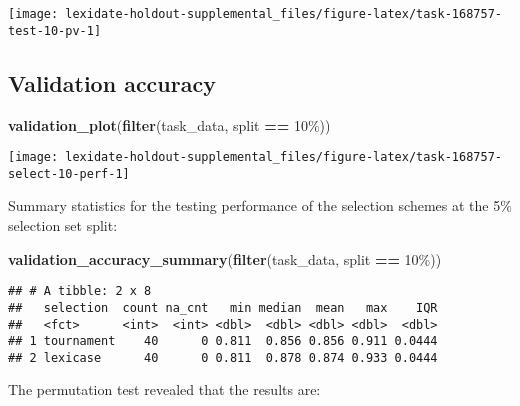 \documentclass[
]{book}
\newenvironment{Shaded}{\begin{snugshade}}{\end{snugshade}}
\newcommand{\FunctionTok}[1]{\textcolor[rgb]{0.13,0.29,0.53}{\textbf{#1}}}
\newcommand{\NormalTok}[1]{#1}
\newcommand{\SpecialCharTok}[1]{\textcolor[rgb]{0.81,0.36,0.00}{\textbf{#1}}}
\newcommand{\StringTok}[1]{\textcolor[rgb]{0.31,0.60,0.02}{#1}}
\begin{document}
\texttt{[image: lexidate-holdout-supplemental\_files/figure-latex/task-168757-test-10-pv-1]}

\hypertarget{validation-accuracy-21}{%
\subsection{Validation accuracy}\label{validation-accuracy-21}}

\begin{Shaded}
\begin{Highlighting}[]
\FunctionTok{validation\_plot}\NormalTok{(}\FunctionTok{filter}\NormalTok{(task\_data, split }\SpecialCharTok{==} \StringTok{\textquotesingle{}10\%\textquotesingle{}}\NormalTok{))}
\end{Highlighting}
\end{Shaded}

\texttt{[image: lexidate-holdout-supplemental\_files/figure-latex/task-168757-select-10-perf-1]}

Summary statistics for the testing performance of the selection schemes at the 5\% selection set split:

\begin{Shaded}
\begin{Highlighting}[]
\FunctionTok{validation\_accuracy\_summary}\NormalTok{(}\FunctionTok{filter}\NormalTok{(task\_data, split }\SpecialCharTok{==} \StringTok{\textquotesingle{}10\%\textquotesingle{}}\NormalTok{))}
\end{Highlighting}
\end{Shaded}

\begin{verbatim}
## # A tibble: 2 x 8
##   selection  count na_cnt   min median  mean   max    IQR
##   <fct>      <int>  <int> <dbl>  <dbl> <dbl> <dbl>  <dbl>
## 1 tournament    40      0 0.811  0.856 0.856 0.911 0.0444
## 2 lexicase      40      0 0.811  0.878 0.874 0.933 0.0444
\end{verbatim}

The permutation test revealed that the results are:
\end{document}

